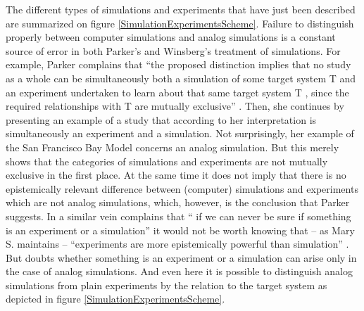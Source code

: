 \documentclass[12pt, a4paper]{article}
\numberwithin{equation}{section}
\begin{document}
The different types of simulations and experiments that have just been described are summarized on figure \ref{SimulationExperimentsScheme}. Failure to distinguish properly between computer simulations and analog simulations is a constant source of error in both Parker's and Winsberg's treatment of simulations. For example, Parker complains that ``the proposed distinction implies that no study as a whole can be simultaneously both a simulation of some target system T and an experiment undertaken to learn about that same target system T , since the required relationships with T are mutually exclusive'' \cite[p.\ 486]{parker:2009}. Then, she continues by presenting an example of a study that according to her interpretation is simultaneously an experiment and a simulation. Not surprisingly, her example of the San Francisco Bay Model concerns an analog simulation. But this merely shows that the categories of simulations and experiments are not mutually exclusive in the first place. At the same time it does not imply that there is no epistemically relevant difference between (computer) simulations and experiments which are not analog simulations, which, however, is the conclusion that Parker suggests. In a similar vein \citet{winsberg:2009} complains that `` if we can never be sure if something is an experiment or a simulation'' it would not be worth knowing that -- as Mary S. \citet{morgan:2003} maintains -- ``experiments are more epistemically powerful than simulation'' \citep[p.\ 582]{winsberg:2009}. But doubts whether something is an experiment or a simulation can arise only in the case of analog simulations. And even here it is possible to distinguish analog simulations from plain experiments by the relation to the target system as depicted in figure \ref{SimulationExperimentsScheme}. 
\end{document}
